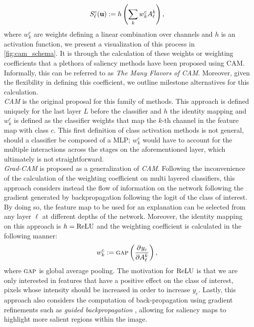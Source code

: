 \begin{equation}
	S^c_\ell(\mathbf{u}) \mathrel{:=} h \left( \sum_k w^c_k A^k_\ell \right),
\label{eq:sal}
\end{equation}
where $w^c_k$ are weights defining a linear combination over channels and $h$ is an activation 
function, we present a visualization of this process in \autoref{fig:cam_schema}. It is through the 
calculation of these weights or weighting coefficients that a plethora of saliency methods have 
been proposed using CAM. Informally, this can be referred to as \emph{The Many Flavors of CAM}.
Moreover, given the flexibility in defining this coefficient, we outline milestone alternatives for 
this calculation.\\



\noindent \emph{CAM} \autocite{zhou2016learning} is the original proposal for this family of 
methods. This approach is defined uniquely for the last layer $L$ before the classifier and $h$ the 
identity mapping and $w^c_k$ is defined as the classifier weights that map the $k$-th channel in 
the feature map with class $c$. This first definition of class activation methods is not general, 
should a classifier be composed of a MLP; $w^c_k$ would have to account for the multiple 
interactions across the stages on the aforementioned layer, which ultimately is not 
straightforward. \\
 
\noindent\emph{Grad-CAM} \autocite{selvaraju2017grad} is proposed as a generalization of \emph{CAM}. 
Following the inconvenience of the calculation of the weighting coefficient on multi layered 
classifiers, this approach considers instead the flow of information on the network following the 
gradient generated by backpropagation following the logit of the class of interest. By doing so, 
the feature map to be used for an explanation can be selected from any
layer $\ell$ at different depths of the network. Moreover, the identity mapping on this approach is 
$h = {\operatorname{ReLU}} $ and the weighting coefficient is calculated in the following manner:
\begin{equation}
	w^c_k \mathrel{:=} {\textsc{gap}} \left( \frac{\partial^{}{y_c}}{\partial{{A^k_\ell}^{}}} \right),
\label{eq:gcam_coeff}
\end{equation}
where ${\textsc{gap}}$ is global average pooling.
The motivation for ${\operatorname{ReLU}}$ is that we are only interested in features that have a positive effect 
on the class of interest, \ie pixels whose intensity should be increased in order to increase $y_c$. 
Lastly, this approach also considers the computation of back-propagation using gradient refinements 
such as \emph{guided backpropagation} \autocite{guidedbackprop}, allowing for saliency maps to 
highlight more salient regions within the image.\\

